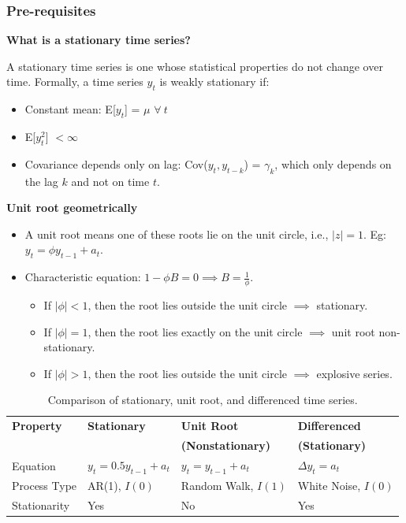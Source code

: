 \begin{frame}[allowframebreaks]
	\frametitle{Pre-requisites}
	\textbf{What is a stationary time series?}
	
	A stationary time series is one whose statistical properties do not change over time. Formally, a time series {$y_t$} is weakly stationary if:
	\begin{itemize}
		\item Constant mean: E[$y_t$] = $\mu$ $\forall\ t$
		\item E[$y_t^2$] $< \infty$
		\item Covariance depends only on lag: Cov($y_t, y_{t-k}$) = $\gamma_k$, which only depends on the lag $k$ and not on time $t$.
	\end{itemize}
	
	\framebreak
	
	\textbf{Unit root geometrically}
	
	\begin{itemize}
		\item A unit root means one of these roots lie on the unit circle, i.e., $|z|=1$. Eg: $y_t = \phi y_{t-1} + a_t$.
		
		\item Characteristic equation: $1 - \phi B = 0 \implies B = \frac{1}{\phi}$.
		
		\begin{itemize}
			\item If $|\phi|<1$, then the root lies outside the unit circle $\implies$ stationary.
			
			\item If $|\phi|=1$, then the root lies exactly on the unit circle $\implies$ unit root non-stationary.
			
			\item If $|\phi|>1$, then the root lies outside the unit circle $\implies$ explosive series.
		\end{itemize}
	\end{itemize}
	
	\framebreak
	
	\begin{table}[h!]
		\centering
		\tiny
		\begin{tabular}{llll}
			\toprule
			\textbf{Property} & \textbf{Stationary} & \textbf{Unit Root} & \textbf{Differenced} \\
			& & \textbf{(Nonstationary)} & \textbf{(Stationary)}\\
			
			\midrule
			Equation & $y_t = 0.5y_{t-1} + a_t$ & $y_t = y_{t-1} + a_t$ & $\Delta y_t = a_t$ \\
			
			Process Type & AR(1), $I(0)$ & Random Walk, $I(1)$ & White Noise, $I(0)$ \\
			
			Stationarity & Yes & No & Yes \\
			\bottomrule
		\end{tabular}
		\caption{Comparison of stationary, unit root, and differenced time series.}
		\label{tab:ts_comparison}
	\end{table}
\end{frame}
